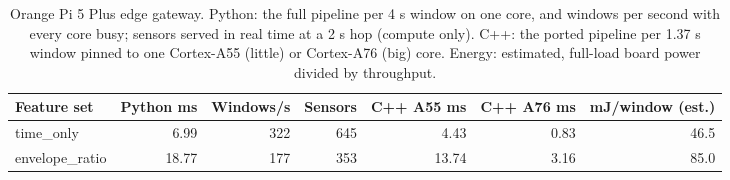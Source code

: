 \begin{table}[t]
\caption{Orange Pi 5 Plus edge gateway. Python: the full pipeline per 4 s window on one core, and windows per second with every core busy; sensors served in real time at a 2 s hop (compute only). C++: the ported pipeline per 1.37 s window pinned to one Cortex-A55 (little) or Cortex-A76 (big) core. Energy: estimated, full-load board power divided by throughput.}
\label{tab:gateway}
\centering
\begin{tabular}{lrrrrrr}
\hline
Feature set & Python ms & Windows/s & Sensors & C++ A55 ms & C++ A76 ms & mJ/window (est.) \\
\hline
time\_only & 6.99 & 322 & 645 & 4.43 & 0.83 & 46.5 \\
envelope\_ratio & 18.77 & 177 & 353 & 13.74 & 3.16 & 85.0 \\
\hline
\end{tabular}
\end{table}
